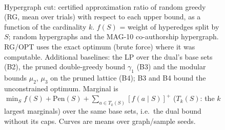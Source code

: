 \begin{figure}[t]
\centering
\setlength{\rgplotwidth}{0.245\textwidth}
\\[1pt]
\hfill
\hfill

\caption{Hypergraph cut: certified approximation ratio of random greedy (RG, mean over trials) with respect to each upper bound, as a function of the cardinality $k$. $f(S)$ = weight of hyperedges split by $S$; random hypergraphs and the MAG-10 co-authorship hypergraph. RG/OPT uses the exact optimum (brute force) where it was computable. Additional baselines: the LP over the dual's base sets (B2), the pruned double-greedy bound $\gamma_1$ (B3) and the modular bounds $\mu_2$, $\mu_3$ on the pruned lattice (B4); B3 and B4 bound the unconstrained optimum. Marginal is $\min_S f(S)+\mathrm{Pen}(S)+\sum_{a\in T_k(S)}[f(a\mid S)]^+$ ($T_k(S)$: the $k$ largest marginals) over the same base sets, i.e.\ the dual bound without its caps. Curves are means over graph/sample seeds.}
\label{fig:rg-hypergraph_cut-wide-baselines}
\end{figure}
